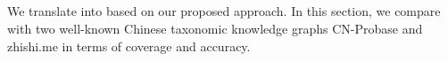 %	

\subsection{\zhpro}
We translate \pro into \zhpro based on our proposed approach. In this section, we compare \zhpro with two well-known Chinese taxonomic knowledge graphs CN-Probase \cite{Xu2017} and zhishi.me \cite{Niu2011} in terms of coverage and accuracy.

